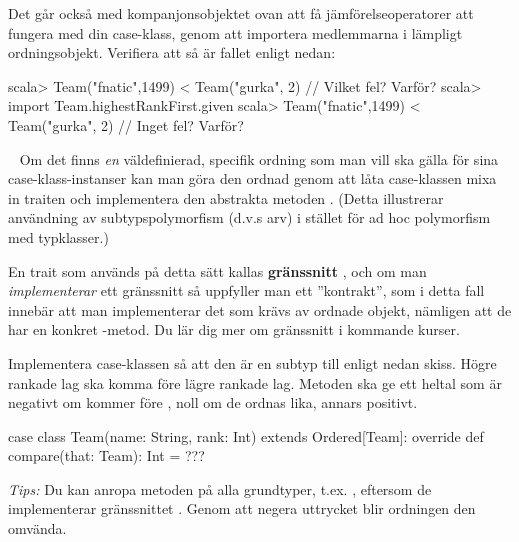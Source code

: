 \Subtask Det går också med kompanjonsobjektet ovan att få jämförelseoperatorer att fungera med din case-klass, genom att importera medlemmarna i lämpligt ordningsobjekt. Verifiera att så är fallet enligt nedan:
\begin{REPL}
scala> Team("fnatic",1499) < Team("gurka", 2)  // Vilket fel? Varför?
scala> import Team.highestRankFirst.given
scala> Team("fnatic",1499) < Team("gurka", 2)  // Inget fel? Varför?
\end{REPL}


\SOLUTION


\TaskSolved \what 

\SubtaskSolved \TODO

\SubtaskSolved \TODO

\SubtaskSolved \TODO

\SubtaskSolved \TODO


\QUESTEND







\QUESTBEGIN

\Task  \what~  Om det finns \emph{en} väldefinierad, specifik ordning som man vill ska gälla för sina case-klass-instanser kan man göra den ordnad genom att låta case-klassen mixa in traiten  och implementera den abstrakta metoden . (Detta illustrerar användning av subtypspolymorfism (d.v.s arv) i stället för ad hoc polymorfism med typklasser.)

\begin{Background}
En trait som används på detta sätt kallas \textbf{gränssnitt} , och om man \emph{implementerar} ett gränssnitt så uppfyller man ett ''kontrakt'', som i detta fall innebär att man implementerar det som krävs av ordnade objekt, nämligen att de har en konkret -metod. Du lär dig mer om gränssnitt i kommande kurser.
\end{Background}

\Subtask Implementera case-klassen  så att den är en subtyp till  enligt nedan skiss. Högre rankade lag ska komma före lägre rankade lag. Metoden  ska ge ett heltal som är negativt om  kommer före , noll om de ordnas lika, annars positivt.

\begin{Code}
case class Team(name: String, rank: Int) extends Ordered[Team]:
  override def compare(that: Team): Int = ???
\end{Code}
\emph{Tips:} Du kan anropa metoden  på alla grundtyper, t.ex. , eftersom de implementerar gränssnittet . Genom att negera uttrycket blir ordningen den omvända. 

